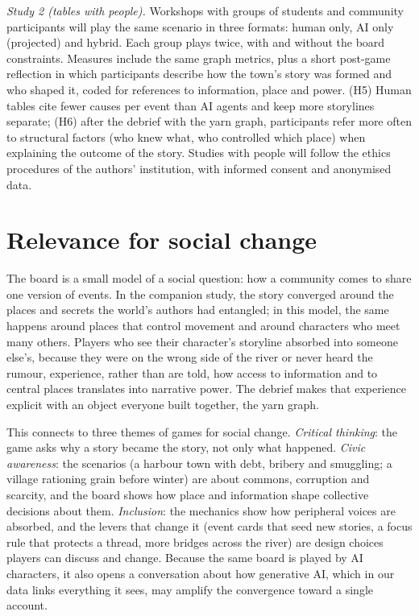 \documentclass[11pt]{article}
\begin{document}
\emph{Study 2 (tables with people).} Workshops with groups of students and
community participants will play the same scenario in three formats: human
only, AI only (projected) and hybrid. Each group plays twice, with and
without the board constraints. Measures include the same graph metrics,
plus a short post-game reflection in which participants describe how the
town's story was formed and who shaped it, coded for references to
information, place and power. (H5) Human tables cite fewer causes per event
than AI agents and keep more storylines separate; (H6) after the debrief
with the yarn graph, participants refer more often to structural factors
(who knew what, who controlled which place) when explaining the outcome of
the story. Studies with people will follow the ethics procedures of the
authors' institution, with informed consent and anonymised data.

\section{Relevance for social change}

The board is a small model of a social question: how a community comes to
share one version of events. In the companion study, the story converged
around the places and secrets the world's authors had entangled; in this
model, the same happens around places that control movement and around
characters who meet many others. Players who see their character's
storyline absorbed into someone else's, because they were on the wrong side
of the river or never heard the rumour, experience, rather than are told,
how access to information and to central places translates into narrative
power. The debrief makes that experience explicit with an object everyone
built together, the yarn graph.

This connects to three themes of games for social change. \emph{Critical
thinking}: the game asks why a story became the story, not only what
happened. \emph{Civic awareness}: the scenarios (a harbour town with debt,
bribery and smuggling; a village rationing grain before winter) are about
commons, corruption and scarcity, and the board shows how place and
information shape collective decisions about them. \emph{Inclusion}: the
mechanics show how peripheral voices are absorbed, and the levers that
change it (event cards that seed new stories, a focus rule that protects a
thread, more bridges across the river) are design choices players can
discuss and change. Because the same board is played by AI characters, it
also opens a conversation about how generative AI, which in our data links
everything it sees, may amplify the convergence toward a single account.
\end{document}
